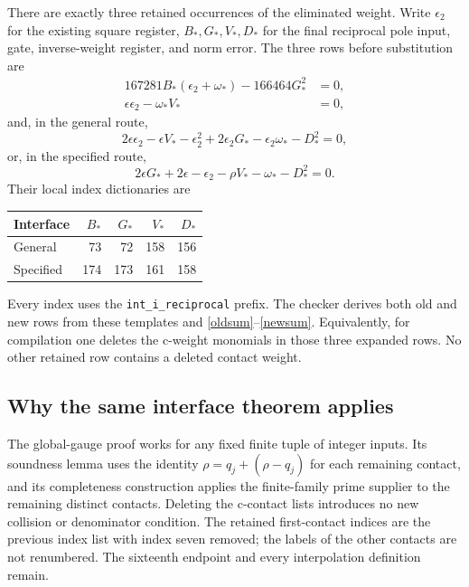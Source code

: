 \documentclass[11pt]{article}
\begin{document}
There are exactly three retained occurrences of the eliminated
weight. Write $\epsilon_2$ for the existing square register,
$B_*,G_*,V_*,D_*$ for the final reciprocal pole input, gate,
inverse-weight register, and norm error. The three rows before
substitution are
\begin{align}
 167281B_*(\epsilon_2+\omega_*)-166464G_*^2&=0,\label{pole}\\
 \epsilon\epsilon_2-\omega_*V_*&=0,\label{inverse}
\end{align}
and, in the general route,
\begin{equation}\label{ggate}
 2\epsilon\epsilon_2-\epsilon V_*-\epsilon_2^2
          +2\epsilon_2G_*-\epsilon_2\omega_*-D_*^2=0,
\end{equation}
or, in the specified route,
\begin{equation}\label{sgate}
 2\epsilon G_*+2\epsilon-\epsilon_2-\rho V_*-\omega_*-D_*^2=0.
\end{equation}
Their local index dictionaries are
\begin{center}
\begin{tabular}{@{}lrrrr@{}}
\toprule
Interface & $B_*$ & $G_*$ & $V_*$ & $D_*$\\
\midrule
General &73&72&158&156\\
Specified &174&173&161&158\\
\bottomrule
\end{tabular}
\end{center}
Every index uses the \texttt{int\_i\_reciprocal} prefix.
The checker derives both old and new rows from these templates
and \eqref{oldsum}--\eqref{newsum}. Equivalently, for compilation
one deletes the c-weight monomials in those three expanded rows.
No other retained row contains a deleted contact weight.

\subsection{Why the same interface theorem applies}

The global-gauge proof \cite{global,bb} works for any fixed finite
tuple of integer inputs. Its soundness lemma uses the identity
$\rho=q_j+(\rho-q_j)$ for each remaining contact, and its
completeness construction applies the finite-family prime supplier
to the remaining distinct contacts. Deleting the c-contact lists
introduces no new collision or denominator condition. The retained
first-contact indices are the previous index list with index seven
removed; the labels of the other contacts are not renumbered.
The sixteenth endpoint and every interpolation definition remain.
\end{document}
